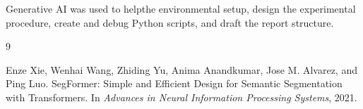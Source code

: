 \documentclass[10pt,a4paper]{article}
\begin{document}
Generative AI was used to helpthe environmental setup, design the experimental procedure, create and debug Python scripts, and draft the report structure.


\begin{thebibliography}{9}

Enze Xie, Wenhai Wang, Zhiding Yu, Anima Anandkumar, Jose M. Alvarez, and Ping Luo.
\newblock SegFormer: Simple and Efficient Design for Semantic Segmentation with Transformers.
\newblock In \textit{Advances in Neural Information Processing Systems}, 2021.

\end{thebibliography}
\end{document}
